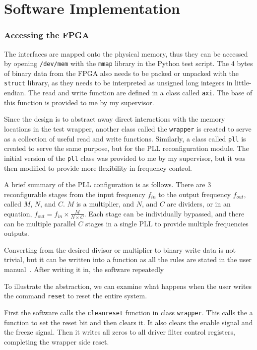 \chapter{Software Implementation}

\subsection{Accessing the FPGA}
The interfaces are mapped onto the physical memory, thus they can be accessed by opening \texttt{/dev/mem} with the \texttt{mmap} library in the Python test script.
The 4 bytes of binary data from the FPGA also needs to be packed or unpacked with the \texttt{struct} library, as they needs to be interpreted as unsigned long integers in little-endian.
The read and write function are defined in a class called \texttt{axi}.
The base of this function is provided to me by my supervisor.

Since the design is to abstract away direct interactions with the memory locations in the test wrapper, another class called the \texttt{wrapper} is created to serve as a collection of useful read and write functions.
Similarly, a class called \texttt{pll} is created to serve the same purpose, but for the PLL reconfiguration module.
The initial version of the \texttt{pll} class was provided to me by my supervisor, but it was then modified to provide more flexibility in frequency control.

A brief summary of the PLL configuration is as follows.
There are 3 reconfigurable stages from the input frequency $f_{in}$ to the output frequency $f_{out}$, called $M$, $N$, and $C$.
$M$ is a multiplier, and $N$, and $C$ are dividers, or in an equation,
$f_{out} = f_{in} \times \frac{M}{N \times C}$.
Each stage can be individually bypassed, and there can be multiple parallel $C$ stages in a single PLL to provide multiple frequencies outputs.

Converting from the desired divisor or multiplier to binary write data is not trivial, but it can be written into a function as all the rules are stated in the user manual~\cite{Altera7}.
After writing it in, the software repeatedly

To illustrate the abstraction, we can examine what happens when the user writes the command \texttt{reset} to reset the entire system.

First the software calls the \texttt{cleanreset} function in class \texttt{wrapper}.
This calls the a function to set the reset bit and then clears it.
It also clears the enable signal and the freeze signal.
Then it writes all zeros to all driver filter control registers, completing the wrapper side reset.


